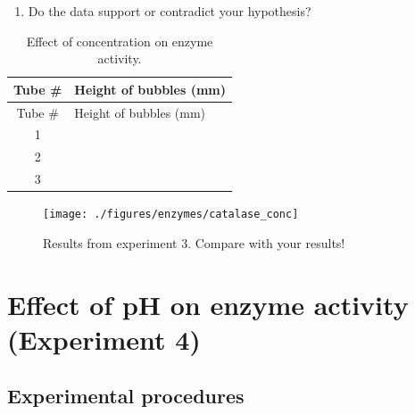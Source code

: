 \documentclass[]{book}
\providecommand{\tightlist}{%
  \setlength{\itemsep}{0pt}\setlength{\parskip}{0pt}}
\begin{document}
\begin{enumerate}
  \begin{itemize}
  \tightlist
  \item
    Add 3 ml of potato juice (catalase).
  \item
    Add 4 ml of hydrogen peroxide. Swirl well to mix and wait at least 20 seconds.
  \item
    Measure the height of the bubble column (in millimeters) and record your observations in Table \ref{tab:concentration}.
  \end{itemize}
\item
  Do the data support or contradict your hypothesis?
\end{enumerate}

\begin{longtable}[]{@{}cl@{}}
\caption{\label{tab:concentration} Effect of concentration on enzyme activity.}\tabularnewline
\toprule
Tube \# & Height of bubbles (mm)\tabularnewline
\midrule
\endfirsthead
\toprule
Tube \# & Height of bubbles (mm)\tabularnewline
\midrule
\endhead
1 &\tabularnewline
2 &\tabularnewline
3 &\tabularnewline
\bottomrule
\end{longtable}

\begin{figure}

{\centering \texttt{[image: ./figures/enzymes/catalase\_conc]} 

}

\caption{Results from experiment 3. Compare with your results!}\label{fig:conc}
\end{figure}

\hypertarget{effect-of-ph-on-enzyme-activity-experiment-4}{%
\section{Effect of pH on enzyme activity (Experiment 4)}\label{effect-of-ph-on-enzyme-activity-experiment-4}}

\hypertarget{experimental-procedures-23}{%
\subsection{Experimental procedures}\label{experimental-procedures-23}}
\end{document}

